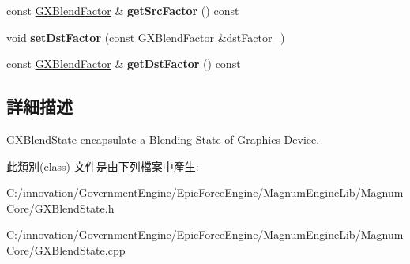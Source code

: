 \begin{DoxyCompactItemize}
\item 
const \hyperlink{class_i_dream_sky_1_1_g_x_blend_factor}{G\+X\+Blend\+Factor} \& {\bfseries get\+Src\+Factor} () const \hypertarget{class_i_dream_sky_1_1_g_x_blend_state_a2614e71b55ec56eb645473dc97ca06f2}{}\label{class_i_dream_sky_1_1_g_x_blend_state_a2614e71b55ec56eb645473dc97ca06f2}

\item 
void {\bfseries set\+Dst\+Factor} (const \hyperlink{class_i_dream_sky_1_1_g_x_blend_factor}{G\+X\+Blend\+Factor} \&dst\+Factor\+\_\+)\hypertarget{class_i_dream_sky_1_1_g_x_blend_state_a976c6ec32b463f8c3cb3966b85ea8646}{}\label{class_i_dream_sky_1_1_g_x_blend_state_a976c6ec32b463f8c3cb3966b85ea8646}

\item 
const \hyperlink{class_i_dream_sky_1_1_g_x_blend_factor}{G\+X\+Blend\+Factor} \& {\bfseries get\+Dst\+Factor} () const \hypertarget{class_i_dream_sky_1_1_g_x_blend_state_a4dbf580e9e9c47fb23314ed7747ac0fb}{}\label{class_i_dream_sky_1_1_g_x_blend_state_a4dbf580e9e9c47fb23314ed7747ac0fb}

\end{DoxyCompactItemize}


\subsection{詳細描述}
\hyperlink{class_i_dream_sky_1_1_g_x_blend_state}{G\+X\+Blend\+State} encapsulate a Blending \hyperlink{class_i_dream_sky_1_1_state}{State} of Graphics Device. 

此類別(class) 文件是由下列檔案中產生\+:\begin{DoxyCompactItemize}
\item 
C\+:/innovation/\+Government\+Engine/\+Epic\+Force\+Engine/\+Magnum\+Engine\+Lib/\+Magnum\+Core/G\+X\+Blend\+State.\+h\item 
C\+:/innovation/\+Government\+Engine/\+Epic\+Force\+Engine/\+Magnum\+Engine\+Lib/\+Magnum\+Core/G\+X\+Blend\+State.\+cpp\end{DoxyCompactItemize}
